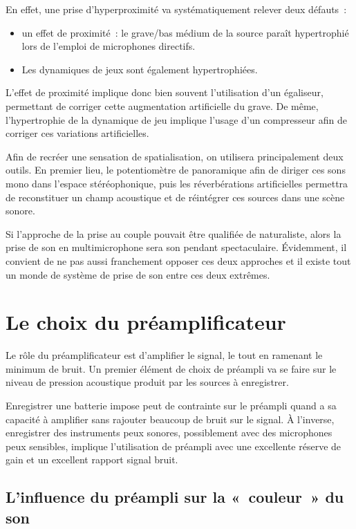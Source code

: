\documentclass[
]{book}
\providecommand{\tightlist}{%
  \setlength{\itemsep}{0pt}\setlength{\parskip}{0pt}}
\begin{document}
En effet, une prise d'hyperproximité va systématiquement relever deux défauts~:

\begin{itemize}
\tightlist
\item
  un effet de proximité~: le grave/bas médium de la source paraît hypertrophié lors de l'emploi de microphones directifs.
\item
  Les dynamiques de jeux sont également hypertrophiées.
\end{itemize}

L'effet de proximité implique donc bien souvent l'utilisation d'un égaliseur, permettant de corriger cette augmentation artificielle du grave. De même, l'hypertrophie de la dynamique de jeu implique l'usage d'un compresseur afin de corriger ces variations artificielles.

Afin de recréer une sensation de spatialisation, on utilisera principalement deux outils. En premier lieu, le potentiomètre de panoramique afin de diriger ces sons mono dans l'espace stéréophonique, puis les réverbérations artificielles permettra de reconstituer un champ acoustique et de réintégrer ces sources dans une scène sonore.

Si l'approche de la prise au couple pouvait être qualifiée de naturaliste, alors la prise de son en multimicrophone sera son pendant spectaculaire. Évidemment, il convient de ne pas aussi franchement opposer ces deux approches et il existe tout un monde de système de prise de son entre ces deux extrêmes.

\hypertarget{le-choix-du-pruxe9amplificateur}{%
\section{Le choix du préamplificateur}\label{le-choix-du-pruxe9amplificateur}}

Le rôle du préamplificateur est d'amplifier le signal, le tout en ramenant le minimum de bruit. Un premier élément de choix de préampli va se faire sur le niveau de pression acoustique produit par les sources à enregistrer.

Enregistrer une batterie impose peut de contrainte sur le préampli quand a sa capacité à amplifier sans rajouter beaucoup de bruit sur le signal. À l'inverse, enregistrer des instruments peux sonores, possiblement avec des microphones peux sensibles, implique l'utilisation de préampli avec une excellente réserve de gain et un excellent rapport signal bruit.

\hypertarget{linfluence-du-pruxe9ampli-sur-la-couleur-du-son}{%
\subsection{L'influence du préampli sur la «~couleur~» du son}\label{linfluence-du-pruxe9ampli-sur-la-couleur-du-son}}
\end{document}
